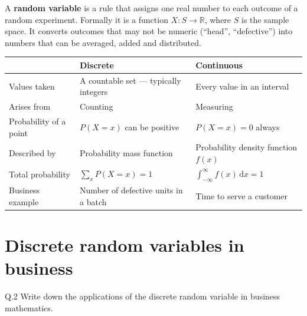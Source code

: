 \begin{solution}
A \textbf{random variable} is a rule that assigns one real number to each
outcome of a random experiment. Formally it is a function $X:S\to\mathbb{R}$,
where $S$ is the sample space. It converts outcomes that may not be numeric
(``head'', ``defective'') into numbers that can be averaged, added and
distributed.

\begin{center}
\small\sffamily
\begin{tabular}{@{}L{3.0cm} L{5.6cm} L{5.6cm}@{}}
\toprule
 & \textbf{Discrete} & \textbf{Continuous} \\
\midrule
Values taken & A countable set --- typically integers & Every value in an interval \\
Arises from & Counting & Measuring \\
Probability of a point & $P(X=x)$ can be positive & $P(X=x)=0$ always \\
Described by & Probability mass function & Probability density function $f(x)$ \\
Total probability & $\sum_x P(X=x)=1$ & $\int_{-\infty}^{\infty} f(x)\,\mathrm{d}x=1$ \\
Business example & Number of defective units in a batch & Time to serve a customer \\
\bottomrule
\end{tabular}
\end{center}

\end{solution}

\section{Discrete random variables in business}

\begin{question}{Q.2}
Write down the applications of the discrete random variable in business
mathematics.
\end{question}

